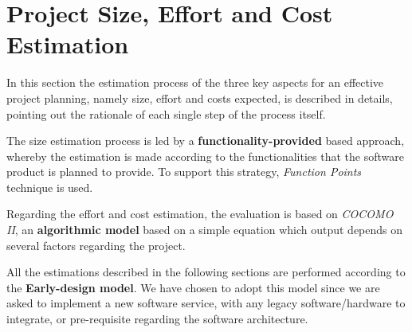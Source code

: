 \section{Project Size, Effort and Cost Estimation}

In this section the estimation process of the three key aspects for an effective project planning, namely size, effort and costs expected, is described in details, pointing out the rationale of each single step of the process itself.

The size estimation process is led by a \textbf{functionality-provided} based approach, whereby the estimation is made according to the functionalities that the software product is planned to provide. To support this strategy, \textit{Function Points} technique is used. 

Regarding the effort and cost estimation, the evaluation is based on \textit{COCOMO II}, an \textbf{algorithmic model} based on a simple equation which output depends on several factors regarding the project.

All the estimations described in the following sections are performed according to the \textbf{Early-design model}. We have chosen to adopt this model since we are asked to implement a new software service, with any legacy software/hardware to integrate, or pre-requisite regarding the software architecture.

	
	
